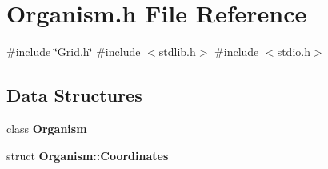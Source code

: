 \section{Organism.\+h File Reference}
\label{Organism_8h}
{\ttfamily \#include \char`\"{}Grid.\+h\char`\"{}}\newline
{\ttfamily \#include $<$stdlib.\+h$>$}\newline
{\ttfamily \#include $<$stdio.\+h$>$}\newline
\subsection*{Data Structures}
\begin{DoxyCompactItemize}
\item 
class \textbf{ Organism}
\item 
struct \textbf{ Organism\+::\+Coordinates}
\end{DoxyCompactItemize}
